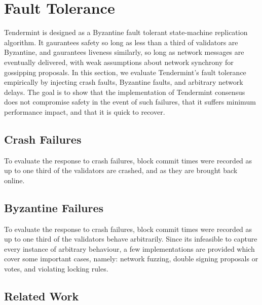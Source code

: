 \chapter{Fault Tolerance}
\label{ch:tolerance}

Tendermint is designed as a Byzantine fault tolerant state-machine replication algorithm.
It gaurantees safety so long as less than a third of validators are Byzantine, 
and gaurantees liveness similarly, so long as network messages are eventually delivered,
with weak assumptions about network synchrony for gossipping proposals.
In this section, we evaluate Tendermint's fault tolerance empirically by injecting 
crash faults, Byzantine faults, and arbitrary network delays.
The goal is to show that the implementation of Tendermint consensus does not compromise safety in the event of such failures,
that it suffers minimum performance impact, and that it is quick to recover.

\section{Crash Failures}

To evaluate the response to crash failures, 
block commit times were recorded as up to one third of the validators are crashed,
and as they are brought back online. 

\section{Byzantine Failures}

To evaluate the response to crash failures, 
block commit times were recorded as up to one third of the validators behave arbitrarily.
Since its infeasible to capture every instance of arbitrary behaviour,
a few implementations are provided which cover some important cases, namely:
network fuzzing, double signing proposals or votes, and violating locking rules.

\section{Related Work}

